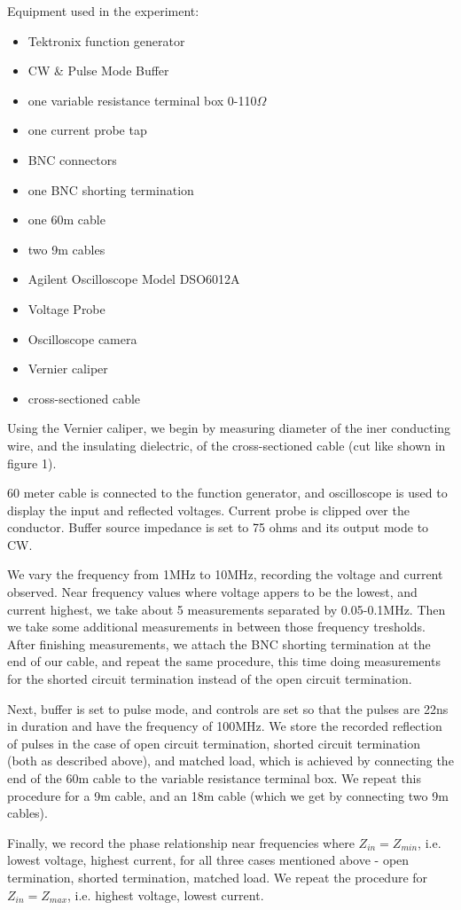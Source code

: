 \documentclass[main.tex]{subfiles}
\begin{document}
Equipment used in the experiment:

\begin{itemize}
	\item Tektronix function generator
	\item CW \& Pulse Mode Buffer
	\item one variable resistance terminal box 0-110$\Omega$
	\item one current probe tap
	\item BNC connectors
	\item one BNC shorting termination
	\item one 60m cable
	\item two 9m cables
	\item Agilent Oscilloscope Model DSO6012A
	\item Voltage Probe
	\item Oscilloscope camera
	\item Vernier caliper
	\item cross-sectioned cable
\end{itemize}

Using the Vernier caliper, we begin by measuring diameter of the iner conducting wire, and the insulating dielectric, of the cross-sectioned cable (cut like shown in figure 1). 

60 meter cable is connected to the function generator, and oscilloscope is used to display the input and reflected voltages. Current probe is clipped over the conductor. Buffer source impedance is set to 75 ohms and its output mode to CW. 

We vary the frequency from 1MHz to 10MHz, recording the voltage and current observed. Near frequency values where voltage appers to be the lowest, and current highest, we take about 5 measurements separated by 0.05-0.1MHz. Then we take some additional measurements in between those frequency tresholds. After finishing measurements, we attach the BNC shorting termination at the end of our cable, and repeat the same procedure, this time doing measurements for the shorted circuit termination instead of the open circuit termination. 

Next, buffer is set to pulse mode, and controls are set so that the pulses are 22ns in duration and have the frequency of 100MHz. We store the recorded reflection of pulses in the case of open circuit termination, shorted circuit termination (both as described above), and matched load, which is achieved by connecting the end of the 60m cable to the variable resistance terminal box. We repeat this procedure for a 9m cable, and an 18m cable (which we get by connecting two 9m cables). 

Finally, we record the phase relationship near frequencies where $Z_{in} = Z_{min}$, i.e. lowest voltage, highest current, for all three cases mentioned above - open termination, shorted termination, matched load. We repeat the procedure for $Z_{in} = Z_{max}$, i.e. highest voltage, lowest current. 
\end{document}
